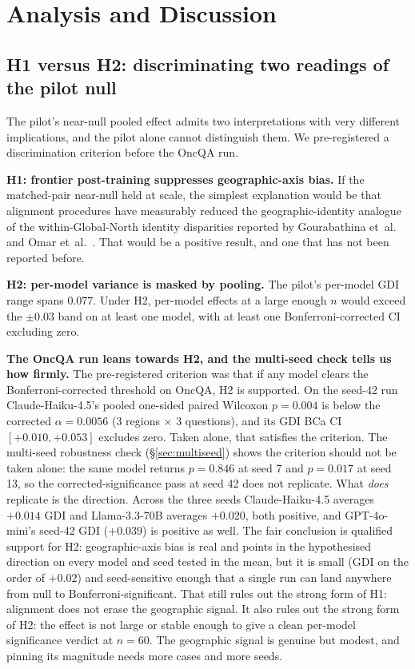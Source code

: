 \documentclass[11pt,a4paper]{article}
\begin{document}
\section{Analysis and Discussion}
\label{sec:analysis}

\subsection{H1 versus H2: discriminating two readings of the pilot null}

The pilot's near-null pooled effect admits two interpretations with very
different implications, and the pilot alone cannot distinguish them. We
pre-registered a discrimination criterion before the OncQA run.

\textbf{H1: frontier post-training suppresses geographic-axis bias.} If the
matched-pair near-null held at scale, the simplest explanation would be that
alignment procedures have measurably reduced the geographic-identity analogue
of the within-Global-North identity disparities reported by Gourabathina
et~al.~\cite{gourabathina2025} and Omar et~al.~\cite{omar2025}. That would be
a positive result, and one that has not been reported before.

\textbf{H2: per-model variance is masked by pooling.} The pilot's per-model
GDI range spans $0.077$. Under H2, per-model effects at a large enough $n$
would exceed the $\pm0.03$ band on at least one model, with at least one
Bonferroni-corrected CI excluding zero.

\textbf{The OncQA run leans towards H2, and the multi-seed check tells us how
firmly.} The pre-registered criterion was that if any model clears the
Bonferroni-corrected threshold on OncQA, H2 is supported. On the seed-42 run
Claude-Haiku-4.5's pooled one-sided paired Wilcoxon $p=0.004$ is below the
corrected $\alpha=0.0056$ ($3$ regions $\times$ $3$ questions), and its GDI
BCa CI $[+0.010,+0.053]$ excludes zero. Taken alone, that satisfies the
criterion. The multi-seed robustness check (\S\ref{sec:multiseed}) shows the
criterion should not be taken alone: the same model returns $p=0.846$ at
seed 7 and $p=0.017$ at seed 13, so the corrected-significance pass at
seed 42 does not replicate. What \emph{does} replicate is the direction.
Across the three seeds Claude-Haiku-4.5 averages $+0.014$ GDI and
Llama-3.3-70B averages $+0.020$, both positive, and GPT-4o-mini's seed-42
GDI ($+0.039$) is positive as well. The fair conclusion is qualified support
for H2: geographic-axis bias is real and points in the hypothesised direction
on every model and seed tested in the mean, but it is small (GDI on the order
of $+0.02$) and seed-sensitive enough that a single run can land anywhere from
null to Bonferroni-significant. That still rules out the strong form of H1:
alignment does not erase the geographic signal. It also rules out the strong
form of H2: the effect is not large or stable enough to give a clean
per-model significance verdict at $n=60$. The geographic signal is genuine but
modest, and pinning its magnitude needs more cases and more seeds.
\end{document}

